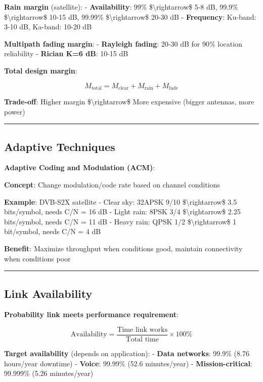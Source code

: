 \textbf{Rain margin} (satellite): - \textbf{Availability}: 99\%
\$\textbackslash rightarrow\$ 5-8 dB, 99.9\%
\$\textbackslash rightarrow\$ 10-15 dB, 99.99\%
\$\textbackslash rightarrow\$ 20-30 dB - \textbf{Frequency}: Ku-band:
3-10 dB, Ka-band: 10-20 dB

\textbf{Multipath fading margin}: - \textbf{Rayleigh fading}: 20-30 dB
for 90\% location reliability - \textbf{Rician K=6 dB}: 10-15 dB

\textbf{Total design margin}:

\[
M_{\text{total}} = M_{\text{clear}} + M_{\text{rain}} + M_{\text{fade}}
\]

\textbf{Trade-off}: Higher margin \$\textbackslash rightarrow\$ More
expensive (bigger antennas, more power)

\begin{center}\rule{0.5\linewidth}{0.5pt}\end{center}

\subsection{Adaptive Techniques}\label{adaptive-techniques}

\textbf{Adaptive Coding and Modulation (ACM)}:

\textbf{Concept}: Change modulation/code rate based on channel
conditions

\textbf{Example}: DVB-S2X satellite - Clear sky: 32APSK 9/10
\$\textbackslash rightarrow\$ 3.5 bits/symbol, needs C/N = 16 dB - Light
rain: 8PSK 3/4 \$\textbackslash rightarrow\$ 2.25 bits/symbol, needs C/N
= 11 dB - Heavy rain: QPSK 1/2 \$\textbackslash rightarrow\$ 1
bit/symbol, needs C/N = 4 dB

\textbf{Benefit}: Maximize throughput when conditions good, maintain
connectivity when conditions poor

\begin{center}\rule{0.5\linewidth}{0.5pt}\end{center}

\subsection{Link Availability}\label{link-availability}

\textbf{Probability link meets performance requirement}:

\[
\text{Availability} = \frac{\text{Time link works}}{\text{Total time}} \times 100\%
\]

\textbf{Target availability} (depends on application): - \textbf{Data
networks}: 99.9\% (8.76 hours/year downtime) - \textbf{Voice}: 99.99\%
(52.6 minutes/year) - \textbf{Mission-critical}: 99.999\% (5.26
minutes/year)

